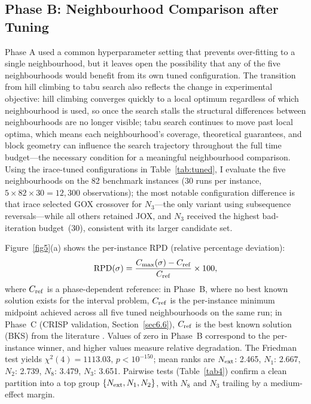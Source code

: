 \documentclass[preprint,12pt]{elsarticle}
\begin{document}
\subsection{Phase B: Neighbourhood Comparison after Tuning}
\label{sec6.5}

Phase A used a common hyperparameter setting that prevents over-fitting to a single neighbourhood, but it leaves open the possibility that any of the five neighbourhoods would benefit from its own tuned configuration. The transition from hill climbing to tabu search also reflects the change in experimental objective: hill climbing converges quickly to a local optimum regardless of which neighbourhood is used, so once the search stalls the structural differences between neighbourhoods are no longer visible; tabu search continues to move past local optima, which means each neighbourhood's coverage, theoretical guarantees, and block geometry can influence the search trajectory throughout the full time budget---the necessary condition for a meaningful neighbourhood comparison. Using the irace-tuned configurations in Table~\ref{tab:tuned}, I evaluate the five neighbourhoods on the 82 benchmark instances (30 runs per instance, $5 \times 82 \times 30 = 12{,}300$ observations); the most notable configuration difference is that irace selected GOX crossover for $N_3$---the only variant using subsequence reversals---while all others retained JOX, and $N_3$ received the highest bad-iteration budget~(30), consistent with its larger candidate set.

Figure~\ref{fig5}(a) shows the per-instance RPD (relative percentage deviation):
\begin{equation}
{\rm RPD}(\sigma) = \frac{C_{\max}(\sigma) - C_{\rm ref}}{C_{\rm ref}} \times 100,
\label{eq:rpd}
\end{equation}
where $C_{\rm ref}$ is a phase-dependent reference: in Phase~B, where no best known solution exists for the interval problem, $C_{\rm ref}$ is the per-instance minimum midpoint achieved across all five tuned neighbourhoods on the same run; in Phase~C (CRISP validation, Section~\ref{sec6.6}), $C_{\rm ref}$ is the best known solution (BKS) from the literature \cite{Taillard1993,Beasley1990,TaillardBKS}. Values of zero in Phase~B correspond to the per-instance winner, and higher values measure relative degradation. The Friedman test yields $\chi^{2}(4) = 1113.03,\, p < 10^{-150}$; mean ranks are $N_{\rm ext}$: 2.465, $N_1$: 2.667, $N_2$: 2.739, $N_8$: 3.479, $N_3$: 3.651. Pairwise tests (Table~\ref{tab4}) confirm a clean partition into a top group $\{N_{\rm ext}, N_1, N_2\}$, with $N_8$ and $N_3$ trailing by a medium-effect margin.
\end{document}
